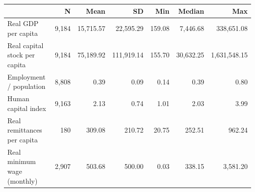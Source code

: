 \begin{tabular}{l*{6}{r}}
\toprule
                    &           N&        Mean&          SD&         Min&      Median&         Max\\
\midrule
Real GDP per capita &       9,184&   15,715.57&   22,595.29&      159.08&    7,446.68&  338,651.08\\
Real capital stock per capita&       9,184&   75,189.92&  111,919.14&      155.70&   30,632.25&1,631,548.15\\
Employment / population&       8,808&        0.39&        0.09&        0.14&        0.39&        0.80\\
Human capital index &       9,163&        2.13&        0.74&        1.01&        2.03&        3.99\\
Real remittances per capita&         180&      309.08&      210.72&       20.75&      252.51&      962.24\\
Real minimum wage (monthly)&       2,907&      503.68&      500.00&        0.03&      338.15&    3,581.20\\
\bottomrule
\end{tabular}

